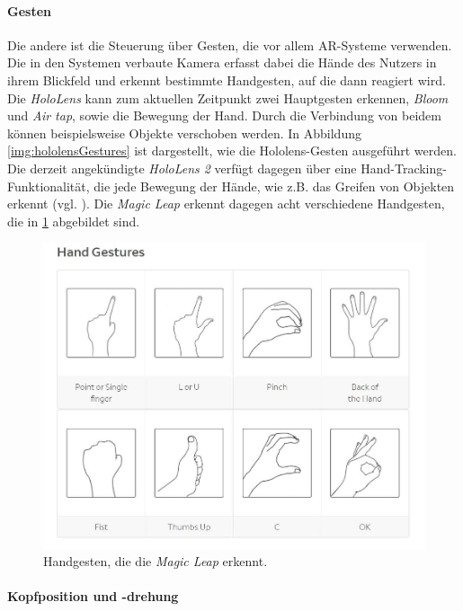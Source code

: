\paragraph{Gesten}
Die andere ist die Steuerung über Gesten, die vor allem AR-Systeme verwenden.
Die in den Systemen verbaute Kamera erfasst dabei die Hände des Nutzers in ihrem Blickfeld und erkennt bestimmte Handgesten, auf die dann reagiert wird. 
Die \textit{HoloLens} kann zum aktuellen Zeitpunkt zwei Hauptgesten erkennen, \textit{Bloom} und \textit{Air tap}, sowie die Bewegung der Hand. Durch die Verbindung von beidem können beispielsweise Objekte verschoben werden. In Abbildung \ref{img:hololensGestures} ist dargestellt, wie die Hololens-Gesten ausgeführt werden. 
Die derzeit angekündigte \textit{HoloLens 2} verfügt dagegen über eine Hand-Tracking-Funktionalität, die jede Bewegung der Hände, wie z.B. das Greifen von Objekten erkennt (vgl. \cite{hololens2}). 
Die \textit{Magic Leap} erkennt dagegen acht verschiedene Handgesten, die in \ref{img:magicGestures} abgebildet sind. 

\begin{figure}[!htb]
	\centering
	\includegraphics[width=0.7\linewidth]{images/magicleapGestures.jpg}
	\caption{Handgesten, die die \textit{Magic Leap} erkennt.}
	\label{img:magicGestures}
\end{figure}
\FloatBarrier

\paragraph{Kopfposition und -drehung}

